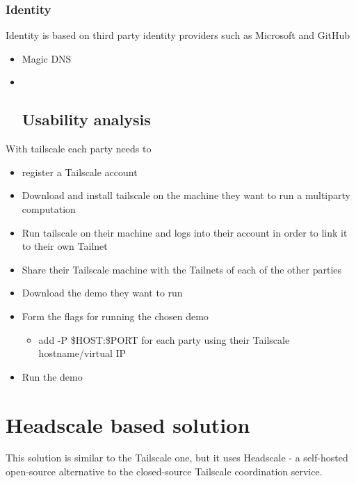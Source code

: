 \hypertarget{identity}{%
\subsection{Identity}\label{identity}}

Identity is based on third party identity providers such as Microsoft
and GitHub

\begin{itemize}
\item
  Magic DNS
\item ~
  \hypertarget{usability-analysis}{%
  \section{Usability analysis}\label{usability-analysis}}
\end{itemize}

With tailscale each party needs to

\begin{itemize}
\tightlist
\item
  register a Tailscale account
\item
  Download and install tailscale on the machine they want to run a
  multiparty computation
\item
  Run tailscale on their machine and logs into their account in order to
  link it to their own Tailnet
\item
  Share their Tailscale machine with the Tailnets of each of the other
  parties
\item
  Download the demo they want to run
\item
  Form the flags for running the chosen demo

  \begin{itemize}
  \tightlist
  \item
    add -P \$HOST:\$PORT for each party using their Tailscale
    hostname/virtual IP
  \end{itemize}
\item
  Run the demo
\end{itemize}

\hypertarget{headscale-based-solution}{%
\chapter{Headscale based solution}\label{headscale-based-solution}}

This solution is similar to the Tailscale one, but it uses Headscale - a
self-hosted open-source alternative to the closed-source Tailscale
coordination service.

